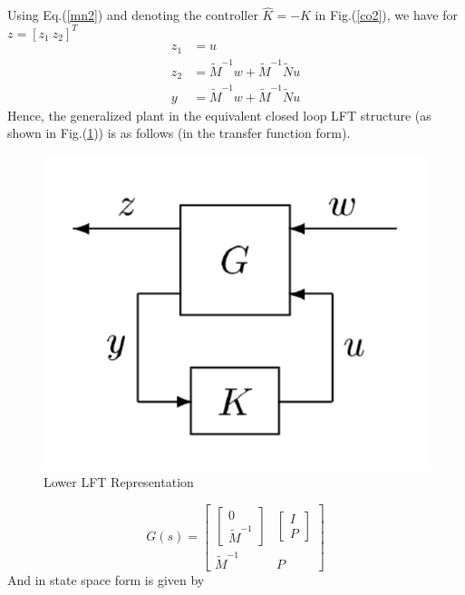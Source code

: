 \documentclass[a4paper,12pt]{article}
\begin{document}
	Using Eq.(\ref{mn2}) and denoting the controller $\hat{K}=-K$ in Fig.(\ref{co2}), we have for $z=[z_{1}\: z_{2}]^{T}$
	\begin{align*}
	z_{1} &= u \\
	z_{2} &= \tilde{M}^{-1}w + \tilde{M}^{-1}\tilde{N}u\\
	y &= \tilde{M}^{-1}w + \tilde{M}^{-1}\tilde{N}u
	\end{align*}
	Hence, the generalized plant in the equivalent closed loop LFT structure (as shown in Fig.(\ref{lft})) is as follows (in the transfer function form).
	\begin{figure}[H]
			  \centering
			  \includegraphics[scale=0.3]{lft}
%			  
			  \caption{Lower LFT Representation}
			 \label{lft}
		\end{figure}
	\begin{equation}
	G(s) = \begin{bmatrix}
	\begin{bmatrix}
	0\\\tilde{M}^{-1}
	\end{bmatrix} & \begin{bmatrix}
	I \\ P
	\end{bmatrix} \\
	\tilde{M}^{-1} & P
	\end{bmatrix}
	\label{tfnm}
	\end{equation}
	And in state space form is given by
\end{document}
